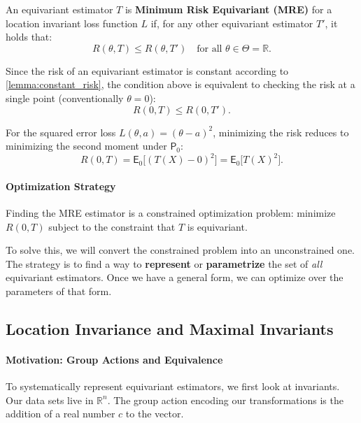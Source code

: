 \begin{definition}
An equivariant estimator \(T\) is \textbf{Minimum Risk Equivariant (MRE)} for a location invariant loss function \(L\) if, for any other equivariant estimator \(T'\), it holds that:
\[
R(\theta, T) \le R(\theta, T') \quad \text{for all } \theta \in \Theta = \mathbb{R}.
\]
\end{definition}

Since the risk of an equivariant estimator is constant according to \autoref{lemma:constant_risk}, the condition above is equivalent to checking the risk at a single point (conventionally \(\theta=0\)):
\[
R(0, T) \le R(0, T').
\]

\begin{ex}
For the squared error loss \(L(\theta, a) = (\theta - a)^2\), minimizing the risk reduces to minimizing the second moment under \(\mathsf{P}_0\):
\[
R(0, T) = \mathsf{E}_0 \big[ (T(X) - 0)^2 \big] = \mathsf{E}_0 \big[ T(X)^2 \big].
\]
\end{ex}

\paragraph{Optimization Strategy}
Finding the MRE estimator is a constrained optimization problem: minimize \(R(0, T)\) subject to the constraint that \(T\) is equivariant.

To solve this, we will convert the constrained problem into an unconstrained one. The strategy is to find a way to \textbf{represent} or \textbf{parametrize} the set of \textit{all} equivariant estimators. Once we have a general form, we can optimize over the parameters of that form.

\subsection{Location Invariance and Maximal Invariants}
\label{par:location_invariance_maximal}

\paragraph{Motivation: Group Actions and Equivalence}
To systematically represent equivariant estimators, we first look at invariants. Our data sets live in \(\mathbb{R}^n\). The group action encoding our transformations is the addition of a real number \(c\) to the vector. 

